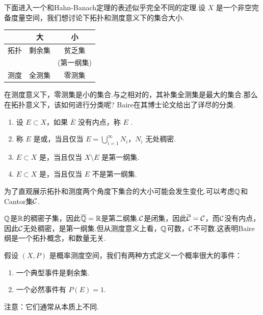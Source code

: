 下面进入一个和Hahn-Banach定理的表述似乎完全不同的定理.设 $X$ 是一个非空完备度量空间，我们想讨论下拓扑和测度意义下的集合大小.\par
\begin{center}
\begin{tabular}{|c|c|c|}
    \hline
    & 大 & 小 \\
    \hline
    拓扑 & 剩余集 & 贫乏集 \\
    &  & (第一纲集) \\
    \hline
    测度 & 全测集 & 零测集 \\
    \hline
\end{tabular}
\end{center}
在测度意义下，零测集是小的集合.与之相对的，其补集全测集是最大的集合.那么在拓扑意义下，该如何进行分类呢? Baire在其博士论文给出了详尽的分类.

\begin{definition}
    \begin{enumerate}[label=(\arabic*)]
        \item 设 $E \subset X$，如果 $\overline{E}$ 没有内点，称 $E$ .
        \item 称 $E$ 是或，当且仅当 $E = \bigcup_{i=1}^\infty N_i$，$N_i$ 无处稠密.
        \item $E \subset X$ 是，当且仅当 $X \setminus E$ 是第一纲集.
        \item $E \subset X$ 是，当且仅当 $E$ 不是第一纲集.
    \end{enumerate}
\end{definition}

为了直观展示拓扑和测度两个角度下集合的大小可能会发生变化.可以考虑$\mathbb{Q}$和Cantor集$\mathcal{C}$.\par
$\mathbb{Q}$是$\mathbb{R}$的稠密子集，因此$\overline{\mathbb{Q}}=\mathbb{R}$是第二纲集.$\mathcal{C}$是闭集，因此$\overline{\mathcal{C}}=\mathcal{C}$，而$\mathcal{C}$没有内点，因此$\mathcal{C}$无处稠密，是第一纲集.但从测度意义上看，$\mathbb{Q}$可数，$\mathcal{C}$不可数.这表明Baire纲是一个拓扑概念，和数量无关.

假设 $(X, P)$ 是概率测度空间，我们有两种方式定义一个概率很大的事件：
\begin{enumerate}[label=(\arabic*),leftmargin=2em]
    \item 一个典型事件是剩余集.
    \item 一个必然事件有 $P(E) = 1$.
\end{enumerate}
注意：它们通常从本质上不同.


